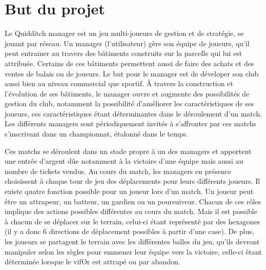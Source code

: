 \documentclass[a4paper,titlepage]{scrreprt}
\begin{document}
\section{But du projet}
  Le \gls{Quidditch} \gls{manager} est un jeu multi-joueurs de gestion
  et de stratégie, se jouant par réseau.
  Un manager (l'utilisateur) gère son équipe de \gls{joueur}s, qu'il peut entrainer
  au travers des bâtiments construits sur la parcelle qui lui est attribuée. Certains de ces bâtiments permettent aussi de faire des achats et des ventes de balais ou de joueurs.
  Le but pour le manager est de déveloper son \gls{club} aussi bien au niveau commercial
  que sportif.
  À travers la construction et l'évolution de ses bâtiments, le manager ouvre et
  augmente des possibilités de gestion du club, notamment la possibilité
  d'améliorer les caractéristiques de ses joueurs, ces caractéristiques
  étant déterminantes dans le déroulement d'un match.
  Les différents managers sont périodiquement invités à s'affronter par
  ces \gls{match}s s'inscrivant dans un championnat, étalonné dans le temps. 
  
  Ces matchs se déroulent
  dans un stade propre à un des managers et apportent une entrée d'argent
  dûe notamment à la victoire d'une équipe mais aussi au nombre de tickets vendus.
  Au cours du match, les managers en présence choisissent à chaque tour de jeu
  des déplacements pour leurs différents joueurs. Il existe quatre fonction possible
  pour un joueur lors d'un match. Un joueur peut être un \gls{attrapeur}, un \gls{batteur}, un \gls{gardien}
  ou un \gls{poursuiveur}.
  Chacun de ces rôles implique des actions possibles différentes au cours du match.
  Mais il est possible à chacun de se déplacer sur le terrain, celui-ci étant représenté par
  des hexagones (il y a donc 6 directions de déplacement possibles à partir d'une case).
  De plus, les joueurs se partagent le terrain avec les différentes balles du jeu, 
  qu'ils devront manipuler selon les règles pour emmener leur équipe vers la victoire,
  celle-ci étant déterminée lorsque le \gls{vifOr} est attrapé ou par abandon.
\end{document}
